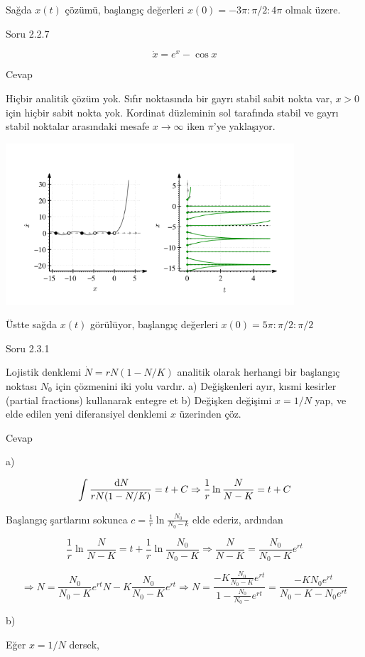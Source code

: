 \documentclass[12pt,fleqn]{article}\usepackage{../../common}
\begin{document}
Sağda $x(t)$ çözümü, başlangıç değerleri $x(0) = -3\pi : \pi/2 : 4\pi$ olmak
üzere.

Soru 2.2.7

$$ \dot{x} = e^x - \cos x $$

Cevap

Hiçbir analitik çözüm yok. Sıfır noktasında bir gayrı stabil sabit nokta var,
$x>0$ için hiçbir sabit nokta yok. Kordinat düzleminin sol tarafında stabil ve
gayrı stabil noktalar arasındaki mesafe $x \to \infty$ iken $\pi$'ye
yaklaşıyor.

\includegraphics[height=6cm]{03_13.png}

Üstte sağda $x(t)$ görülüyor, başlangıç değerleri $x(0) = 5\pi : \pi/2 : \pi/2$

Soru 2.3.1

Lojistik denklemi $\dot{N} = rN (1-N/K)$ analitik olarak herhangi bir başlangıç
noktası $N_0$ için çözmenini iki yolu vardır. a) Değişkenleri ayır, kısmi
kesirler (partial fractions) kullanarak entegre et b) Değişken değişimi $x=1/N$
yap, ve elde edilen yeni diferansiyel denklemi $x$ üzerinden çöz.

Cevap

a)

$$
\int \frac{\,\mathrm{d} N}{rN(1-N/K)} = t + C \Rightarrow
\frac{1}{r} \ln \frac{N}{N-K} = t + C
$$

Başlangıç şartlarını sokunca $c = \frac{1}{r} \ln \frac{N_0}{N_0 - k}$ elde
ederiz, ardından

$$ \frac{1}{r} \ln \frac{N}{N-K} = t + \frac{1}{r} \ln \frac{N_0}{N_0 - K} \Rightarrow
\frac{N}{N-K} = \frac{N_0}{N_0 - K} e^{rt} 
$$

$$
\Rightarrow
N = \frac{N_0}{N_0 - K} e^{rt} N - K \frac{N_0}{N_0 - K}e^{rt} \Rightarrow
N = \frac{-K \frac{N_0}{N_0-K} e^{rt}}{1 - \frac{N_0}{N_0-}e^{rt}} =
\frac{-K N_0 e^{rt}}{N_0 - K - N_0e^{rt}}
$$

b)

Eğer $x=1/N$ dersek,
\end{document}
